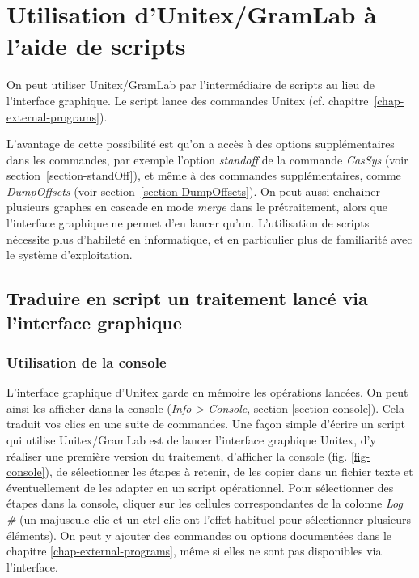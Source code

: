 \chapter{Utilisation d'Unitex/GramLab à l'aide de scripts}
\label{chap-scripts}

On peut utiliser Unitex/GramLab par l'intermédiaire de scripts au lieu de l'interface graphique. Le script lance des commandes Unitex (cf. chapitre~\ref{chap-external-programs}).

\bigskip
\noindent L'avantage de cette possibilité est qu'on a accès à des options supplémentaires dans les commandes, par exemple l'option \textit{standoff} de la commande \textit{CasSys} (voir section~\ref{section-standOff}), et même à des commandes supplémentaires, comme \textit{DumpOffsets} (voir section~\ref{section-DumpOffsets}). On peut aussi enchainer plusieurs graphes en cascade en mode \emph{merge} dans le prétraitement, alors que l'interface graphique ne permet d'en lancer qu'un.
L'utilisation de scripts nécessite plus d'habileté en informatique, et en particulier plus de familiarité avec le système d'exploitation.

\section{Traduire en script un traitement lancé via l'interface graphique}

\subsection{Utilisation de la console}

L'interface graphique d'Unitex garde en mémoire les opérations lancées. On peut ainsi les afficher dans la console (\emph{Info > Console}, section \ref{section-console}). Cela traduit vos clics en une suite de commandes. Une façon simple d'écrire un script qui utilise Unitex/GramLab est de lancer l'interface graphique Unitex, d'y réaliser une première version du traitement, d'afficher la console (fig. \ref{fig-console}), de sélectionner les étapes à retenir, de les copier dans un fichier texte et éventuellement de les adapter en un script opérationnel. Pour sélectionner des étapes dans la console, cliquer sur les cellules correspondantes de la colonne \textit{Log \#} (un majuscule-clic et un ctrl-clic ont l'effet habituel pour sélectionner plusieurs éléments). On peut y ajouter des commandes ou options documentées dans  le chapitre \ref{chap-external-programs}, même si elles ne sont pas disponibles via l'interface.

